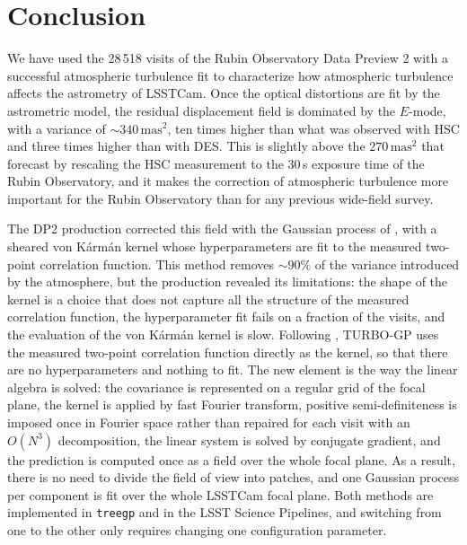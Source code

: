 \section{Conclusion}
\label{Conclusion}

We have used the 28\,518 visits of the Rubin Observatory Data Preview 2 with a successful atmospheric turbulence fit to characterize how atmospheric turbulence affects 
the astrometry of LSSTCam.
Once the optical distortions are fit by the astrometric model, the residual displacement field is dominated by the $E$-mode, with a variance of ${\sim}340\,\mathrm{mas}^2$, 
ten times higher than what was observed with HSC and three times higher than with DES.
This is slightly above the $270\,\mathrm{mas}^2$ that  forecast by rescaling the HSC measurement to the 30\,s exposure time of the 
Rubin Observatory, and it makes the correction of atmospheric turbulence more important for the Rubin Observatory than for any previous wide-field survey.

The DP2 production corrected this field with the Gaussian process of , with a sheared von K\'arm\'an kernel whose hyperparameters are 
fit to the measured two-point correlation function.
This method removes ${\sim}90\%$ of the variance introduced by the atmosphere, but the production revealed its limitations: the shape of the kernel is a choice that 
does not capture all the structure of the measured correlation function, the hyperparameter fit fails on a fraction of the visits, and the evaluation of the 
von K\'arm\'an kernel is slow.
Following , TURBO-GP uses the measured two-point correlation function directly as the kernel, so that there are no hyperparameters 
and nothing to fit.
The new element is the way the linear algebra is solved: the covariance is represented on a regular grid of the focal plane, the kernel is applied by fast 
Fourier transform, positive semi-definiteness is imposed once in Fourier space rather than repaired for each visit with an $O(N^3)$ decomposition, the 
linear system is solved by conjugate gradient, and the prediction is computed once as a field over the whole focal plane.
As a result, there is no need to divide the field of view into patches, and one Gaussian process per component is fit over the whole LSSTCam focal plane.
Both methods are implemented in \texttt{treegp} and in the LSST Science Pipelines, and switching from one to the other only requires changing one configuration parameter.

